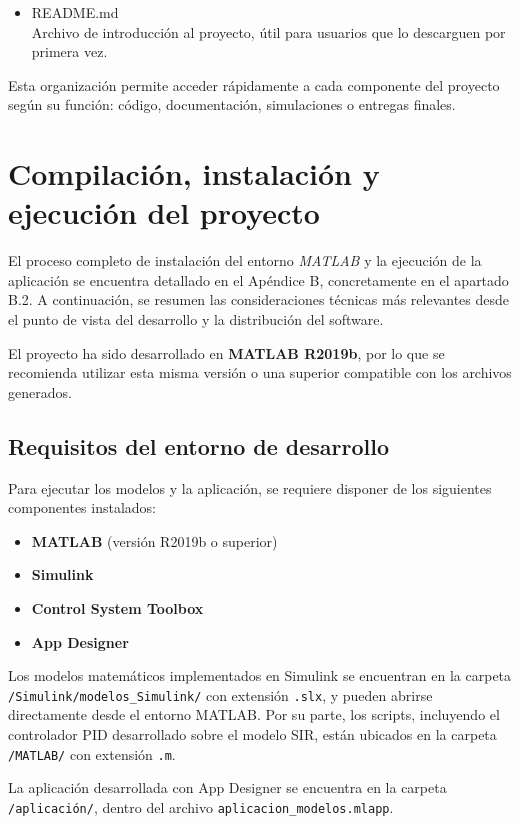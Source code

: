 \begin{itemize}
    \item README.md \\
    Archivo de introducción al proyecto, útil para usuarios que lo descarguen por primera vez.
\end{itemize}

Esta organización permite acceder rápidamente a cada componente del proyecto según su función: código, documentación, simulaciones o entregas finales.


\section{Compilación, instalación y ejecución del proyecto}

El proceso completo de instalación del entorno \textit{MATLAB} y la ejecución de la aplicación se encuentra detallado en el Apéndice B, concretamente en el apartado B.2. A continuación, se resumen las consideraciones técnicas más relevantes desde el punto de vista del desarrollo y la distribución del software.

El proyecto ha sido desarrollado en \textbf{MATLAB R2019b}, por lo que se recomienda utilizar esta misma versión o una superior compatible con los archivos generados.

\subsection*{Requisitos del entorno de desarrollo}
Para ejecutar los modelos y la aplicación, se requiere disponer de los siguientes componentes instalados:

\begin{itemize}
    \item \textbf{MATLAB} (versión R2019b o superior)
    \item \textbf{Simulink}
    \item \textbf{Control System Toolbox}
    \item \textbf{App Designer}
\end{itemize}

Los modelos matemáticos implementados en Simulink se encuentran en la carpeta \texttt{/Simulink/modelos\_Simulink/} con extensión \texttt{.slx}, y pueden abrirse directamente desde el entorno MATLAB. Por su parte, los scripts, incluyendo el controlador PID desarrollado sobre el modelo SIR, están ubicados en la carpeta \texttt{/MATLAB/} con extensión \texttt{.m}.

La aplicación desarrollada con App Designer se encuentra en la carpeta \texttt{/aplicación/}, dentro del archivo \texttt{aplicacion\_modelos.mlapp}.

